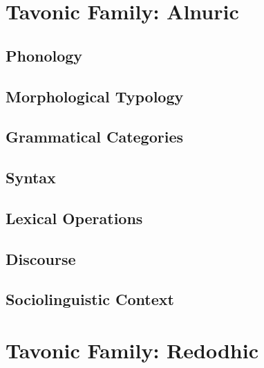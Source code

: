 \documentclass[12pt,letterpaper,openany,twoside]{memoir}
\let\originalpart=\part
\def\part{\cleardoublepage\originalpart}
\begin{document}


\part{Tavonic Family: Alnuric}



\chapter{Phonology}

\chapter{Morphological Typology}

\chapter{Grammatical Categories}

\chapter{Syntax}

\chapter{Lexical Operations}

\chapter{Discourse}

\chapter{Sociolinguistic Context}



\part{Tavonic Family: Redodhic}
\end{document}
